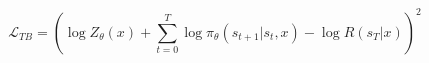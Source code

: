 \begin{equation}\label{form:TB}
     \mathcal{L}_{TB} = \left(\log Z_\theta(x) + \sum_{t=0}^{T} \log \pi_\theta(s_{t+1}|s_{t}, x) - \log R(s_T \vert x)\right)^2
\end{equation}     











